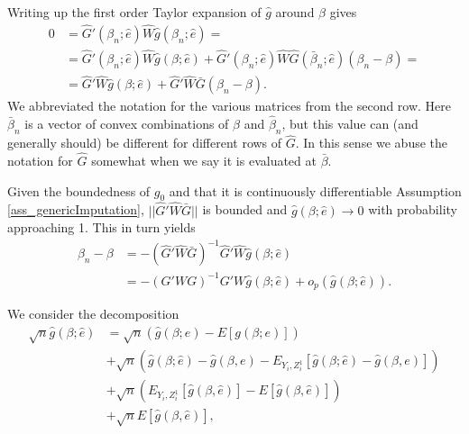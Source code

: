 \documentclass{article}
\theoremstyle{definition}
\theoremstyle{remark}
\begin{document}
Writing up the first order Taylor expansion of $\hat{g}$ around $\beta$ gives
\begin{align}
0&=\hat{G}'(\beta_n;\hat{e})\hat{W}\hat{g}(\beta_n;\hat{e})= \\ &=\hat{G}'(\beta_n;\hat{e})\hat{W}\hat{g}(\beta;\hat{e})+ \hat{G}'(\beta_n;\hat{e})\hat{W}\hat{G}(\bar{\beta}_n;\hat{e})(\beta_n-\beta)= \nonumber \\
&= \hat{G}'\hat{W}\hat{g}(\beta;\hat{e})+ \hat{G}'\hat{W}\bar{G}(\beta_n-\beta). \nonumber
\end{align}
We abbreviated the notation for the various matrices from the second row. Here $\bar{\beta}_n$ is a vector of convex combinations of $\beta$ and $\hat{\beta}_n$, but this value can (and generally should) be different for different rows of $\hat{G}$. In this sense we abuse the notation for $\hat{G}$ somewhat when we say it is evaluated at $\bar{\beta}$.


Given the boundedness of $g_0$ and that it is continuously differentiable  Assumption \ref{ass_genericImputation}, $||\hat{G}'\hat{W}\bar{G}||$ is bounded and $\hat{g}(\beta; \hat{e}) \rightarrow 0$ with probability approaching 1. This in turn yields
\begin{align}
\beta_n -\beta&=-(\hat{G}'\hat{W}\bar{G})^{-1} \hat{G}'\hat{W} \hat{g}(\beta; \hat{e}) \\
&= -(G'WG)^{-1}G'W \hat{g}(\beta; \hat{e}) + o_p(\hat{g}(\beta; \hat{e})).\nonumber
\end{align}

We consider the decomposition
\begin{align}
\sqrt{n}\hat{g}(\beta; \hat{e}) &= \sqrt{n}\left(\hat{g}(\beta; e) - E[g(\beta;e)]\right) \\
&+\sqrt{n}(\hat{g}(\beta; \hat{e}) - \hat{g}(\beta,e)- E_{Y_i,Z^1_i}[\hat{g}(\beta; \hat{e})-\hat{g}(\beta,e)]) \nonumber \\
& + \sqrt{n}\left(E_{Y_i,Z^1_i}[\hat{g}(\beta,\hat{e})]-E[\hat{g}(\beta,\hat{e})]\right) \nonumber \\ & 
 + \sqrt{n} E[\hat{g}(\beta,\hat{e})], \nonumber
\end{align}
\end{document}
